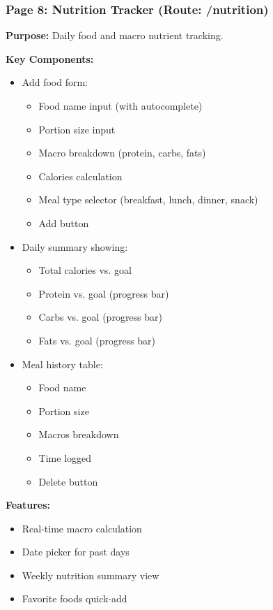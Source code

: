 \documentclass[12pt,a4paper]{article}
\begin{document}

\subsubsection*{Page 8: Nutrition Tracker (Route: /nutrition)}

\textbf{Purpose:} Daily food and macro nutrient tracking.

\textbf{Key Components:}
\begin{itemize}[noitemsep, topsep=2pt]
  \item Add food form:
    \begin{itemize}[noitemsep, topsep=0pt]
      \item Food name input (with autocomplete)
      \item Portion size input
      \item Macro breakdown (protein, carbs, fats)
      \item Calories calculation
      \item Meal type selector (breakfast, lunch, dinner, snack)
      \item Add button
    \end{itemize}
  \item Daily summary showing:
    \begin{itemize}[noitemsep, topsep=0pt]
      \item Total calories vs. goal
      \item Protein vs. goal (progress bar)
      \item Carbs vs. goal (progress bar)
      \item Fats vs. goal (progress bar)
    \end{itemize}
  \item Meal history table:
    \begin{itemize}[noitemsep, topsep=0pt]
      \item Food name
      \item Portion size
      \item Macros breakdown
      \item Time logged
      \item Delete button
    \end{itemize}
\end{itemize}

\textbf{Features:}
\begin{itemize}[noitemsep, topsep=2pt]
  \item Real-time macro calculation
  \item Date picker for past days
  \item Weekly nutrition summary view
  \item Favorite foods quick-add
\end{itemize}
\end{document}
